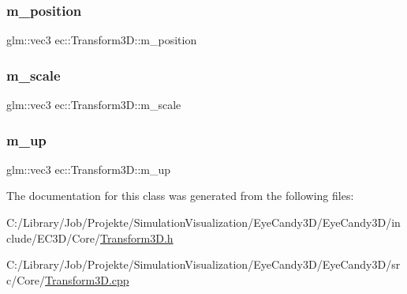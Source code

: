 \subsubsection{\texorpdfstring{m\+\_\+position}{m\_position}}
{\footnotesize\ttfamily glm\+::vec3 ec\+::\+Transform3\+D\+::m\+\_\+position\hspace{0.3cm}{\ttfamily [protected]}}

\mbox{\label{classec_1_1_transform3_d_a8eb8cecaa5ec8273e49c9487e0f6b935}} 
\subsubsection{\texorpdfstring{m\+\_\+scale}{m\_scale}}
{\footnotesize\ttfamily glm\+::vec3 ec\+::\+Transform3\+D\+::m\+\_\+scale\hspace{0.3cm}{\ttfamily [protected]}}

\mbox{\label{classec_1_1_transform3_d_addd1132fb57befe841dfd9af94aa4329}} 
\subsubsection{\texorpdfstring{m\+\_\+up}{m\_up}}
{\footnotesize\ttfamily glm\+::vec3 ec\+::\+Transform3\+D\+::m\+\_\+up\hspace{0.3cm}{\ttfamily [protected]}}



The documentation for this class was generated from the following files\+:\begin{DoxyCompactItemize}
\item 
C\+:/\+Library/\+Job/\+Projekte/\+Simulation\+Visualization/\+Eye\+Candy3\+D/\+Eye\+Candy3\+D/include/\+E\+C3\+D/\+Core/\mbox{\hyperlink{_transform3_d_8h}{Transform3\+D.\+h}}\item 
C\+:/\+Library/\+Job/\+Projekte/\+Simulation\+Visualization/\+Eye\+Candy3\+D/\+Eye\+Candy3\+D/src/\+Core/\mbox{\hyperlink{_transform3_d_8cpp}{Transform3\+D.\+cpp}}\end{DoxyCompactItemize}
